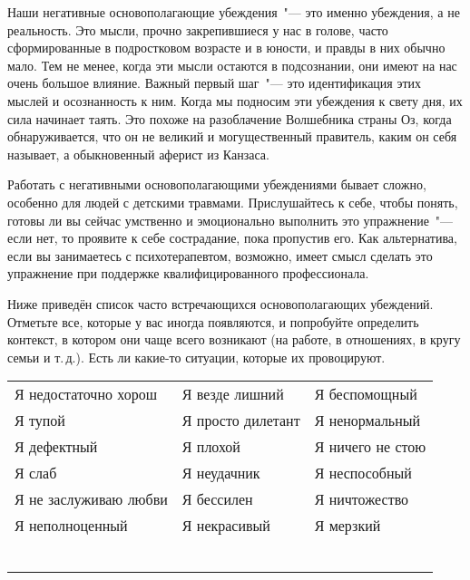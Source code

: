 \newpage
{} \label{Ex:Working_with_Our_Negative_Core_Beliefs}

Наши негативные основополагающие убеждения~"--- это именно убеждения, а не реальность. Это мысли, прочно закрепившиеся у нас в голове, часто сформированные в подростковом возрасте и в юности, и правды в них обычно мало. Тем не менее, когда эти мысли остаются в подсознании, они имеют на нас очень большое влияние. Важный первый шаг~"--- это идентификация этих мыслей и осознанность к ним. Когда мы подносим эти убеждения к свету дня, их сила начинает таять. Это похоже на разоблачение Волшебника страны Оз, когда обнаруживается, что он не великий и могущественный правитель, каким он себя называет, а обыкновенный аферист из Канзаса.

Работать с негативными основополагающими убеждениями бывает сложно, особенно для людей с детскими травмами. Прислушайтесь к себе, чтобы понять, готовы ли вы сейчас умственно и эмоционально выполнить это упражнение~"--- если нет, то проявите к себе сострадание, пока пропустив его. Как альтернатива, если вы занимаетесь с психотерапевтом, возможно, имеет смысл сделать это упражнение при поддержке квалифицированного профессионала.

\vspace{3ex}


\vspace{1ex}

Ниже приведён список часто встречающихся основополагающих убеждений. Отметьте все, которые у вас иногда появляются, и попробуйте определить контекст, в котором они чаще всего возникают (на работе, в отношениях, в кругу семьи и т.\,д.). Есть ли какие-то ситуации, которые их провоцируют.

\vspace{1ex}

\begin{center}
	\setlength{\extrarowheight}{2mm}
	\noindent\begin{tabular}{lll}
		Я недостаточно хорош & Я везде лишний & Я беспомощный \\
		Я тупой & Я просто дилетант & Я ненормальный \\
		Я дефектный & Я плохой & Я ничего не стою \\
		Я слаб & Я неудачник & Я неспособный \\
		Я не заслуживаю любви & Я бессилен & Я ничтожество \\
		Я неполноценный & Я некрасивый & Я мерзкий \\
		\\
		\\
		\arrayrulecolor{gray}\hline\\
		\hline\\
		\hline\\
		\hline\\
	\end{tabular}
	\setlength{\extrarowheight}{0mm}
\end{center}

